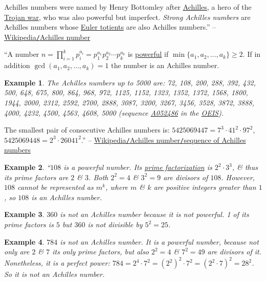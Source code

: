 \documentclass{article}
\newtheorem{example}{Example}
\begin{document}
Achilles numbers were named by Henry Bottomley after \href{https://en.wikipedia.org/wiki/Achilles}{Achilles}, a hero of the \href{https://en.wikipedia.org/wiki/Trojan_war}{Trojan war}, who was also powerful but imperfect. \textit{Strong Achilles numbers} are Achilles numbers whose \href{https://en.wikipedia.org/wiki/Euler_totient}{Euler totients} are also Achilles numbers.'' -- \href{https://en.wikipedia.org/wiki/Achilles_number}{Wikipedia{\tt /}Achilles number}

``A number $n = \prod_{i=1}^k p_i^{a_i} = p_1^{a_1}p_2^{a_2}\cdots p_k^{a_k}$ is \href{https://en.wikipedia.org/wiki/Powerful_number}{powerful} if $\min\{a_1,a_2,\ldots,a_k\}\ge2$. If in addition $\operatorname{gcd}(a_1,a_2,\ldots,a_k) = 1$ the number is an Achilles number.

\begin{example}
	The Achilles numbers up to 5000 are: \emph{72, 108, 200, 288, 392, 432, 500, 648, 675, 800, 864, 968, 972, 1125, 1152, 1323, 1352, 1372, 1568, 1800, 1944, 2000, 2312, 2592, 2700, 2888, 3087, 3200, 3267, 3456, 3528, 3872, 3888, 4000, 4232, 4500, 4563, 4608, 5000} (sequence \href{https://oeis.org/A052486}{A052486} in the \href{https://en.wikipedia.org/wiki/On-Line_Encyclopedia_of_Integer_Sequences}{OEIS}).
\end{example}
The smallest pair of consecutive Achilles numbers is: $5425069447 = 7^3\cdot41^2\cdot97^2$, $5425069448 = 2^3\cdot26041^2$.'' -- \href{https://en.wikipedia.org/wiki/Achilles_number#Sequence_of_Achilles_numbers}{Wikipedia{\tt /}Achilles number{\tt /}sequence of Achilles numbers}

\begin{example}
	``$108$ is a powerful number. Its \href{https://en.wikipedia.org/wiki/Prime_factorization}{prime factorization} is $2^2\cdot3^3$, \& thus its prime factors are $2$ \& $3$. Both $2^2 = 4$ \& $3^2 = 9$ are divisors of $108$. However, $108$ cannot be represented as $m^k$, where $m$ \& $k$ are positive integers greater than $1$, so $108$ is an Achilles number. 
\end{example}

\begin{example}
	$360$ is not an Achilles number because it is not powerful. 1 of its prime factors is $5$ but $360$ is not divisible by $5^2 = 25$.
\end{example}

\begin{example}
	$784$ is not an Achilles number. It is a powerful number, because not only are $2$ \& $7$ its only prime factors, but also $2^2 = 4$ \& $7^2 = 49$ are divisors of it. Nonetheless, it is a perfect power: $784 = 2^4\cdot7^2 = (2^2)^2\cdot7^2 = (2^2\cdot7)^2 = 28^2$. So it is not an Achilles number.
\end{example}
\end{document}
